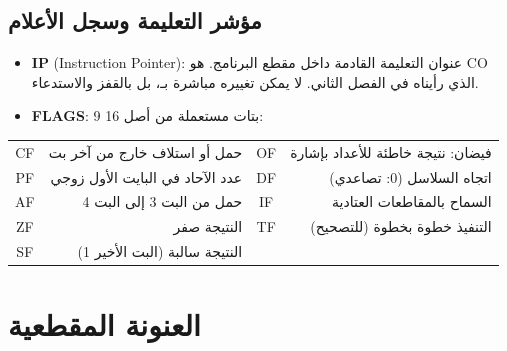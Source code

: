 \subsection{مؤشر التعليمة وسجل الأعلام}
\begin{itemize}
    \item \textbf{\textenglish{IP}} \textenglish{(Instruction Pointer)}: عنوان التعليمة القادمة داخل مقطع البرنامج.
          هو \textenglish{CO} الذي رأيناه في الفصل الثاني. لا يمكن تغييره مباشرة بـ، بل بالقفز والاستدعاء.
    \item \textbf{\textenglish{FLAGS}}: 9 بتات مستعملة من أصل 16:
\end{itemize}

\begin{center}
\end{center}

\begin{center}
\small
\begin{tabularx}{\linewidth}{|c|R||c|R|}
    \hline
     &  &  &  \\ \hline
    \textenglish{CF} & حمل أو استلاف خارج من آخر بت & \textenglish{OF} & فيضان: نتيجة خاطئة للأعداد بإشارة \\ \hline
    \textenglish{PF} & عدد الآحاد في البايت الأول زوجي & \textenglish{DF} & اتجاه السلاسل (0: تصاعدي) \\ \hline
    \textenglish{AF} & حمل من البت 3 إلى البت 4 & \textenglish{IF} & السماح بالمقاطعات العتادية \\ \hline
    \textenglish{ZF} & النتيجة صفر & \textenglish{TF} & التنفيذ خطوة بخطوة (للتصحيح) \\ \hline
    \textenglish{SF} & النتيجة سالبة (البت الأخير 1) & & \\ \hline
\end{tabularx}
\end{center}

\section{العنونة المقطعية}

